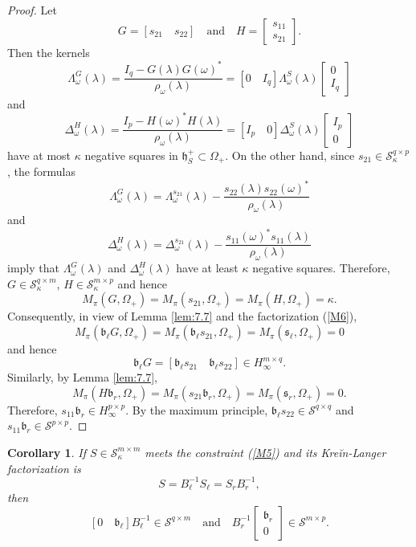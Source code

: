 \documentclass[12pt,twoside,a4paper]{amsart}
\newtheorem{corollary}[thm]{Corollary}
\theoremstyle{definition}
\numberwithin{equation}{section}
\begin{document}
\begin{proof} Let
$$
G=[s_{21}\quad s_{22}] \quad\text{and}\quad H=\begin{bmatrix}s_{11}\\s_{21}
\end{bmatrix}.
$$
Then the kernels
$$
{\mathsf
\Lambda}^G_\omega(\lambda)=\frac{I_q-G({\lambda})G(\omega)^*}{\rho_\omega(\lambda)}=
[0\quad I_q] {\mathsf
\Lambda}^S_\omega(\lambda)\begin{bmatrix}0\\I_q\end{bmatrix}
$$
and
$$
{\mathsf
\Delta}^H_\omega({\lambda})=\frac{I_p-H(\omega)^*H(\lambda)}{\rho_\omega(\lambda)}=
[I_p\quad 0] {\mathsf
\Delta}^S_\omega(\lambda)\begin{bmatrix}I_p\\0\end{bmatrix}
$$
have at most $\kappa$ negative squares in ${{\mathfrak h}}^+_S\subset\Omega_+$.
On the other hand, since $s_{21}\in{\mathcal S}^{q\times p}_\kappa$, the
formulas
$$
{\mathsf  \Lambda}^G_\omega(\lambda)={\mathsf
\Lambda}^{s_{21}}_\omega(\lambda)-
\frac{s_{22}({\lambda})s_{22}(\omega)^*}{\rho_\omega(\lambda)}
$$
and
$$
{\mathsf  \Delta}^H_\omega({\lambda})={\mathsf
\Delta}^{s_{21}}_\omega({\lambda})-\frac{s_{11}(\omega)^*s_{11}(\lambda)}
{\rho_\omega(\lambda)}
$$
imply that ${\mathsf  \Lambda}^G_\omega(\lambda)$ and ${\mathsf
\Delta}^H_\omega(\lambda)$ have at least $\kappa$ negative squares.
Therefore, $G\in{{\mathcal S}}^{q\times m}_\kappa$, $H\in{{\mathcal S}}_\kappa^{m\times
p}$ and hence
\begin{equation}
\label{M8}
M_{\pi}(G,\Omega_+)=M_{\pi}(s_{21},\Omega_+)=M_{\pi}(H,\Omega_+)=\kappa.
\end{equation}
Consequently, in view of Lemma \ref{lem:7.7} and the factorization
(\ref{M6}),
$$
M_\pi({{\mathfrak b}}_\ell G, \Omega_+)=M_\pi({{\mathfrak b}}_\ell s_{21}, \Omega_+)=
M_\pi({{\mathfrak s}}_\ell, \Omega_+)=0
$$
and hence
$$
{{\mathfrak b}}_\ell G=[{{\mathfrak b}}_\ell s_{21}\quad {{\mathfrak b}}_\ell s_{22}]\in
H_\infty^{m\times q}.
$$
Similarly, by Lemma \ref{lem:7.7},
$$
M_\pi(H{{\mathfrak b}}_r,\Omega_+)=M_\pi(s_{21}{{\mathfrak b}}_r,\Omega_+)
=M_\pi({{\mathfrak s}}_r,\Omega_+)=0.
$$
Therefore, $s_{11}{{\mathfrak b}}_r\in H_\infty^{p\times p}$. By the maximum principle,
${{\mathfrak b}}_\ell s_{22}\in {{\mathcal S}}^{q\times q}$ and
$s_{11}{{\mathfrak b}}_r\in {{\mathcal S}}^{p\times p}$.
\end{proof}

\begin{corollary}
\label{cor:11.3a}
If $S\in{{\mathcal S}}^{m\times m}_\kappa$ meets the constraint (\ref{M5}) and  its Kre\u{i}n-Langer factorization
is\begin{equation}\label{BlKLfact}
    S=B_\ell^{-1}S_\ell=S_rB_r^{-1},
\end{equation}
then
$$
[0\quad {{\mathfrak b}}_\ell]B_\ell^{-1}\in {{\mathcal S}}^{q\times m}\quad\text{and}\quad
B_r^{-1}\begin{bmatrix}{{\mathfrak b}}_r\\0\end{bmatrix}\in {{\mathcal S}}^{m\times p}.
$$
\end{corollary}
\end{document}
